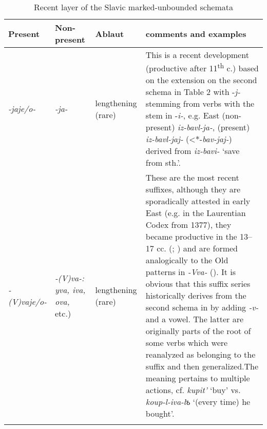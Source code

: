 \documentclass[output=paper]{langsci/langscibook}
\begin{document}
\begin{table}
\caption{Recent layer of the Slavic marked-unbounded schemata}
\label{tab:wiemerserzant:3}
\begin{tabularx}{\textwidth}{lXQ>{\raggedright\arraybackslash}p{5cm}}
\lsptoprule
 Present & Non-present & Ablaut & comments and examples\\
\midrule 
 \textit{-jaje/o-} & \textit{-ja-} &  lengthening (rare) & This is a recent development (productive after 11\textsuperscript{th} c.) based on the extension on the second schema in Table 2 with -\textit{j-} stemming from verbs with the stem in \mbox{-\textit{i-},} e.g. East  (non-present) \textit{iz-bavl-ja-}, (present) \textit{iz-bavl-jaj-} (<*-\textit{bav-jaj-}) derived from \textit{iz-bavi-} ‘save from sth.’.\\
 \textit{-(V)vaje/o-} & \textit{-(V)va-:}
 \textit{yva, iva, ova,} etc.) &  lengthening
  (rare) & These are the most recent suffixes, although they are sporadically attested in early East  (e.g. in the Laurentian Codex from 1377), they became productive in the 13--17 cc. (\citealt[387]{Ivanov1964}; \citealt[131]{Andersen2009}) and are formed analogically to the Old  patterns in \textit{-Vva-} (\citealt[212f.]{Kiparsky1967}). It is obvious that this suffix series historically derives from the second schema in  by adding \textit{-v-} and a vowel. The latter are originally parts of the root of some verbs which were reanalyzed as belonging to the suffix and then generalized.\footnotemark  The meaning pertains to multiple actions, cf. \textit{kupit’} ‘buy’ vs. \textit{koup-l-iva-l}\textit{ъ} ‘(every time) he bought’. \\
\lspbottomrule
\end{tabularx}
\end{table}
\end{document}
